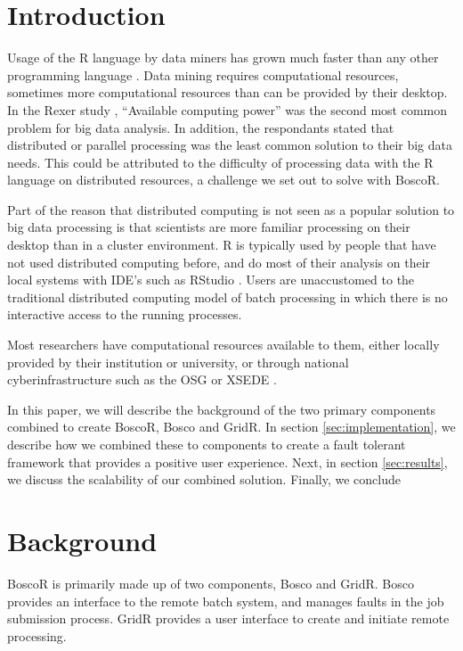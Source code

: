 \documentclass[conference]{IEEEtran}
\begin{document}
\section{Introduction}
Usage of the R language \cite{team2012r} by data miners has grown much faster than any other programming language \cite{rexer2013, KDnuggets2013}.  Data mining requires computational resources, sometimes more computational resources than can be provided by their desktop.  In the Rexer study \cite{rexer2013}, ``Available computing power'' was the second most common problem for big data analysis.  In addition, the respondants stated that distributed or parallel processing was the least common solution to their big data needs.  This could be attributed to the difficulty of processing data with the R language on distributed resources, a challenge we set out to solve with BoscoR.

Part of the reason that distributed computing is not seen as a popular solution to big data processing is that scientists are more familiar processing on their desktop than in a cluster environment.  R is typically used by people that have not used distributed computing before, and do most of their analysis on their local systems with IDE's such as RStudio \cite{racine2012rstudio}.  Users are unaccustomed to the traditional distributed computing model of batch processing in which there is no interactive access to the running processes.

Most researchers have computational resources available to them, either locally provided by their institution or university, or through national cyberinfrastructure such as the OSG \cite{pordes2007open} or XSEDE \cite{xsede}.



In this paper, we will describe the background of the two primary components combined to create BoscoR, Bosco and GridR.  In section \ref{sec:implementation}, we describe how we combined these to components to create a fault tolerant framework that provides a positive user experience.  Next, in section \ref{sec:results}, we discuss the scalability of our combined solution.  Finally, we conclude 

\section{Background}
BoscoR is primarily made up of two components, Bosco and GridR.  Bosco provides an interface to the remote batch system, and manages faults in the job submission process.  GridR provides a user interface to create and initiate remote processing.
\end{document}
